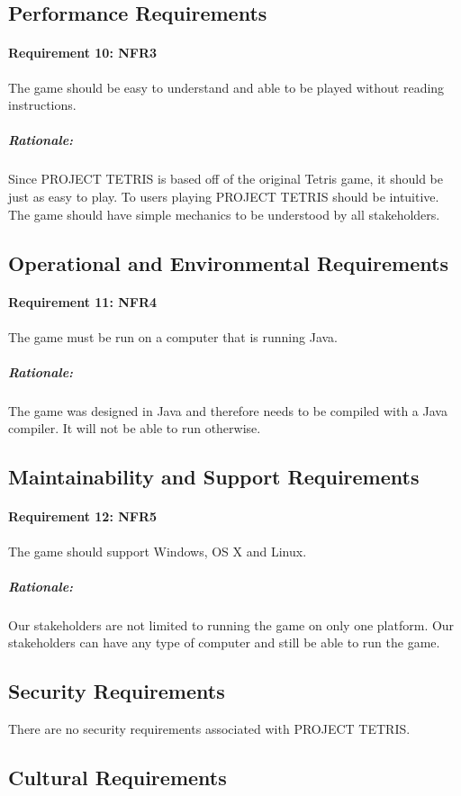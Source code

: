 \documentclass[12pt, titlepage]{article}
\begin{document}
\subsection{Performance Requirements}
\paragraph{Requirement 10: NFR3}
The game should be easy to understand and able to be played without reading instructions.
\subparagraph{Rationale:}
Since PROJECT TETRIS is based off of the original Tetris game, it should be just as easy to play. To users playing PROJECT TETRIS should be intuitive. The game should have simple mechanics to be understood by all stakeholders.

\subsection{Operational and Environmental Requirements}
\paragraph{Requirement 11: NFR4}
The game must be run on a computer that is running Java.
\subparagraph{Rationale:}
The game was designed in Java and therefore needs to be compiled with a Java compiler. It will not be able to run otherwise.

\subsection{Maintainability and Support Requirements}
\paragraph{Requirement 12: NFR5}
The game should support Windows, OS X and Linux.
\subparagraph{Rationale:}
Our stakeholders are not limited to running the game on only one platform. Our stakeholders can have any type of computer and still be able to run the game.

\subsection{Security Requirements}
There are no security requirements associated with PROJECT TETRIS.

\subsection{Cultural Requirements}
\end{document}
